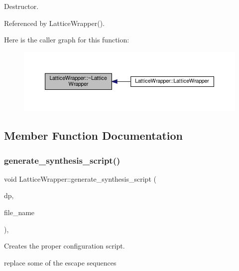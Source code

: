 Destructor. 



Referenced by Lattice\+Wrapper().

Here is the caller graph for this function\+:
\nopagebreak
\begin{figure}[H]
\begin{center}
\leavevmode
\includegraphics[width=350pt]{d4/d55/classLatticeWrapper_aa618aa25dfd5af58458645f6f1031734_icgraph}
\end{center}
\end{figure}


\subsection{Member Function Documentation}
\mbox{\label{classLatticeWrapper_a99d36b0acec057fc76e8dca262920c63}} 
\subsubsection{\texorpdfstring{generate\+\_\+synthesis\+\_\+script()}{generate\_synthesis\_script()}}
{\footnotesize\ttfamily void Lattice\+Wrapper\+::generate\+\_\+synthesis\+\_\+script (\begin{DoxyParamCaption}\item[{const \hyperlink{DesignParameters_8hpp_ae36bb1c4c9150d0eeecfe1f96f42d157}{Design\+Parameters\+Ref} \&}]{dp,  }\item[{const std\+::string \&}]{file\+\_\+name }\end{DoxyParamCaption})\hspace{0.3cm}{\ttfamily [override]}, {\ttfamily [virtual]}}



Creates the proper configuration script. 

replace some of the escape sequences 


